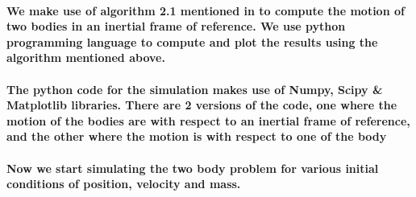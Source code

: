 \paragraph{
    We make use of algorithm 2.1 mentioned in  to compute the motion of two bodies in an inertial frame of reference. We use python programming language to compute and plot the results using the algorithm mentioned above.
}

\paragraph{
    The python code for the simulation makes use of Numpy, Scipy \& Matplotlib libraries. There are 2 versions of the code, one where the motion of the bodies are with respect to an inertial frame of reference, and the other where the motion is with respect to one of the body
}

\paragraph{
    Now we start simulating the two body problem for various initial conditions of position, velocity and mass.
}
